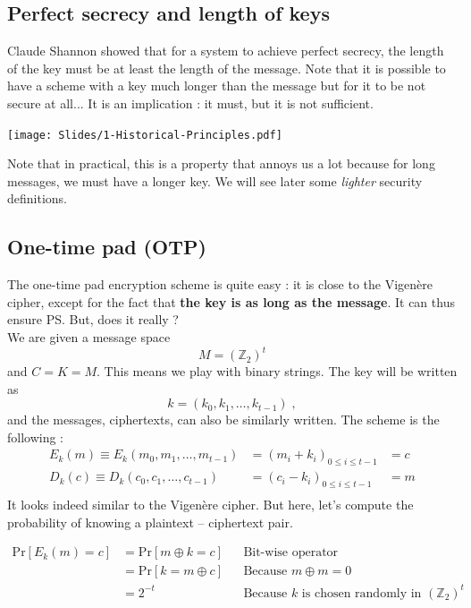 \documentclass[../Cryptography.tex]{subfiles}
\begin{document}
\subsection{Perfect secrecy and length of keys}
Claude Shannon showed that for a system to achieve perfect secrecy, the length of the key must be at least the length of the message. Note that it is possible to have a scheme with a key much longer than the message but for it to be not secure at all... It is an implication : it must, but it is not sufficient.  \\
\begin{center}
    \texttt{[image: Slides/1-Historical-Principles.pdf]}
\end{center}
Note that in practical, this is a property that annoys us a lot because for long messages, we must have a longer key. We will see later some \textit{lighter} security definitions.

\subsection{One-time pad (OTP)}
The one-time pad encryption scheme is quite easy : it is close to the Vigenère cipher, except for the fact that \textbf{the key is as long as the message}. It can thus ensure PS. But, does it really ? \\

We are given a message space $$ M = (\mathbb{Z}_2)^t$$ and $C = K = M$. This means we play with binary strings. The key will be written as $$ k = (k_0,k_1, \dots, k_{t-1}) \; ,$$
and the messages, ciphertexts, can also be similarly written. The scheme is the following :
$$
\begin{array}{lll}
    E_k(m) \equiv E_k(m_0, m_1, \dots, m_{t-1}) &= (m_i + k_i)_{0\leq i \leq t-1} &= c \\
    D_k(c) \equiv D_k(c_0, c_1, \dots, c_{t-1}) &= (c_i - k_i)_{0\leq i \leq t-1} &= m \\
\end{array}$$
It looks indeed similar to the Vigenère cipher. But here, let's compute the probability of knowing a plaintext -- ciphertext pair.


\begin{align*}
\mathrm{Pr}[E_k(m) = c] &= \mathrm{Pr}[m\oplus k = c] && \text{Bit-wise operator}\\
&= \mathrm{Pr}[k = m \oplus c] && \text{Because $m\oplus m = 0$}\\
&= 2^{-t} && \text{Because $k$ is chosen randomly in $(\mathbb{Z}_2)^t$}
\end{align*}
\end{document}
